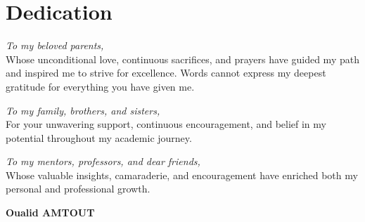 \chapter*{Dedication}

\begin{dedication}
\large
\textit{To my beloved parents,}\\
\normalsize
Whose unconditional love, continuous sacrifices, and prayers have guided my path and inspired me to strive for excellence. Words cannot express my deepest gratitude for everything you have given me.
\par
\vspace{1.5\baselineskip}

\large
\textit{To my family, brothers, and sisters,}\\
\normalsize
For your unwavering support, continuous encouragement, and belief in my potential throughout my academic journey.
\par
\vspace{1.5\baselineskip}

\large
\textit{To my mentors, professors, and dear friends,}\\
\normalsize
Whose valuable insights, camaraderie, and encouragement have enriched both my personal and professional growth.
\par
\vspace{2\baselineskip}

\raggedleft
\large \textbf{Oualid AMTOUT}
\end{dedication}
